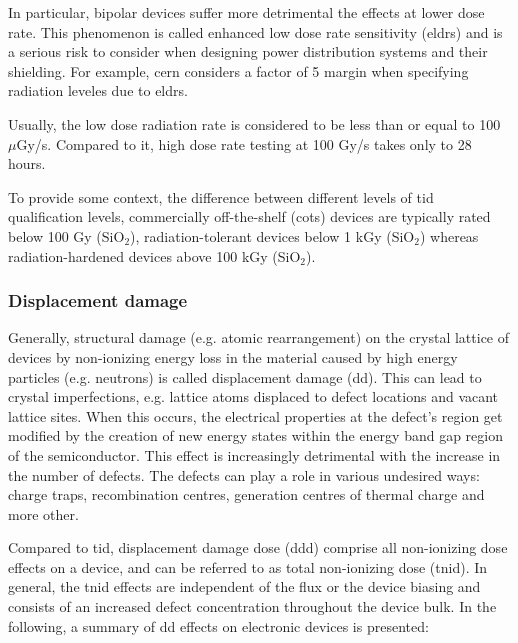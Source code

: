 \documentclass[encoding=utf8,british]{tumphthesis}
\begin{document}
In particular, bipolar devices suffer more detrimental the effects at lower dose rate. This phenomenon is called enhanced low dose rate sensitivity (\acrshort{eldrs}) and is a serious risk to consider when designing power distribution systems and their shielding. For example, \acrshort{cern} considers a factor of 5 margin when specifying radiation leveles due to \acrshort{eldrs}.

Usually, the low dose radiation rate is considered to be less than or equal to 100 $\mu$Gy/s. Compared to it, high dose rate testing at 100 Gy/s takes only to 28 hours.

To provide some context, the difference between different levels of \acrshort{tid} qualification levels, commercially off-the-shelf (\acrshort{cots}) devices are typically rated below 100 Gy (SiO$_2$), radiation-tolerant devices below 1 kGy (SiO$_2$) whereas radiation-hardened devices above 100 kGy (SiO$_2$). 


\subsubsection{Displacement damage}

Generally, structural damage (e.g. atomic rearrangement) on the crystal lattice of devices by non-ionizing energy loss in the material caused by high energy particles (e.g. neutrons) is called displacement damage (\acrshort{dd}). This can lead to crystal imperfections, e.g. lattice atoms displaced to defect locations and vacant lattice sites. When this occurs, the electrical properties at the defect’s region get modified by the creation of new energy states within the energy band gap region of the semiconductor. This effect is increasingly detrimental with the increase in the number of defects. The defects can play a role in various undesired ways: charge traps, recombination centres, generation centres of thermal charge and more other.

Compared to \acrshort{tid}, displacement damage dose (\acrshort{ddd}) comprise all non-ionizing dose effects on a device, and can be referred to as total non-ionizing dose (\acrshort{tnid}). In general, the \acrshort{tnid} effects are independent of the flux or the device biasing and consists of an increased defect concentration throughout the device bulk. In the following, a summary of \acrshort{dd} effects on electronic devices is presented:
\end{document}
